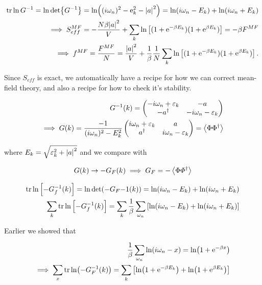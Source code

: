 \begin{align*}
    \tr \ln G^{-1} = \ln \det{G^{-1}} = \ln((i\omega_n)^2 - \mathrm{e}_k^{2} -\abs{a}^{2}) = \ln(i\omega_n - E_k) + \ln(i\omega_n + E_k) \\ 
    \implies S_{eff}^{MF} = -\frac{N\beta \abs{a}^2}{V} + \sum_k \ln \left[ (1+\mathrm{e}^{-\beta E_k})(1 + \mathrm{e}^{\beta E_k})\right] = -\beta F^{MF} \\ 
    \implies f^{MF} = \frac{F^{MF}}{N} = \frac{\abs{a}^2}{V} +\frac{1}{\beta} \frac{1}{N}\sum_k \ln \left[ (1+\mathrm{e}^{-\beta E_k})(1 + \mathrm{e}^{\beta E_k})\right].
\end{align*}

Since $S_{eff}$ is exact, we automatically have a recipe for how we can correct mean-field theory, and also a recipe for how to check it's stability. 

\begin{align*}
    G^{-1}(k) = \begin{pmatrix}-i\omega_n + \varepsilon_k  & -a \\ -a^{\dagger} & -i\omega_n -\varepsilon_k \end{pmatrix} \\ 
    \implies G(k) = \frac{-1}{(i\omega_n)^2 - E_k^{2}} \begin{pmatrix}i\omega_n + \varepsilon_k  & a \\ a^{\dagger} & i\omega_n - \varepsilon_k \end{pmatrix} = \expval{\Phi \Phi^\dagger} 
\end{align*}

where $E_k = \sqrt{\varepsilon_k ^2 + \abs{a}^2}$ and we compare with 

\begin{align*}
    G(k) \to -G_F(k) \implies G_F = - \expval{\Phi \varPhi^\dagger}
\end{align*}

\begin{align*}
    \tr \ln \left[-G_f ^{-1} (k) \right] = \ln \det(-G_F {-1} (k)) = \ln(i\omega_n - E_k) + \ln(i\omega_n + E_k)\\ 
    \sum_k \tr \ln \left[-G_f ^{-1} (k) \right] = \sum_k \frac{1}{\beta} \sum_{\omega_n} \left[ \ln(i\omega_n - E_k) + \ln(i\omega_n + E_k) \right]
\end{align*}

Earlier we showed that 

\begin{align*}
    \frac{1}{\beta}\sum_{\omega_n} \ln(i\omega_n - x) = \ln(1 + \mathrm{e}^{-\beta x}) \\ 
    \implies \sum_x \tr \ln(-G_F ^{-1}(k)) = \sum_k \left[\ln(1 + \mathrm{e}^{-\beta E_k}) + \ln(1 + \mathrm{e}^{\beta E_k})\right] 
\end{align*}

